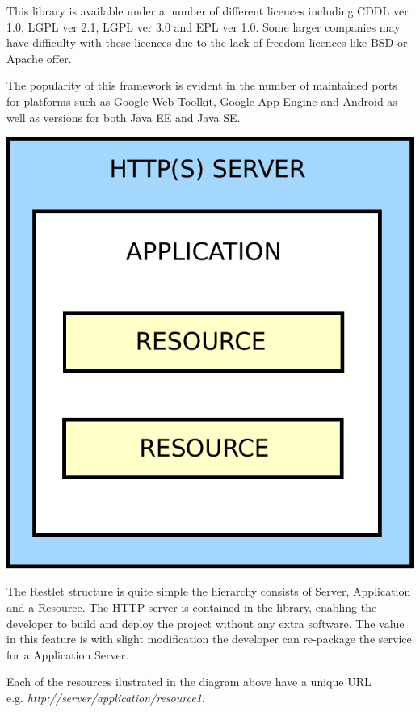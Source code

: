 \documentclass[pdftex,11pt,a4paper]{article}
\begin{document}
This library is available under a number of different licences including CDDL ver 1.0, LGPL ver 2.1, LGPL ver 3.0 and EPL ver 1.0. Some larger companies may have difficulty with these licences due to the lack of freedom licences like BSD or Apache offer.

The popularity of this framework is evident in the number of maintained ports for platforms such as Google Web Toolkit, Google App Engine and Android as well as versions for both Java EE and Java SE.

\begin{center}
	\includegraphics[scale=0.5]{images/restlet_structure.pdf}
\end{center}

The Restlet structure is quite simple the hierarchy consists of Server, Application and a  Resource. The HTTP server is contained in the library, enabling the developer to build and deploy the project without any extra software.  The value in this feature is with slight modification the developer can re-package the service for a Application Server.



Each of the resources ilustrated in the diagram above have a unique URL \\ e.g. \emph{http://server/application/resource1}.
\end{document}
